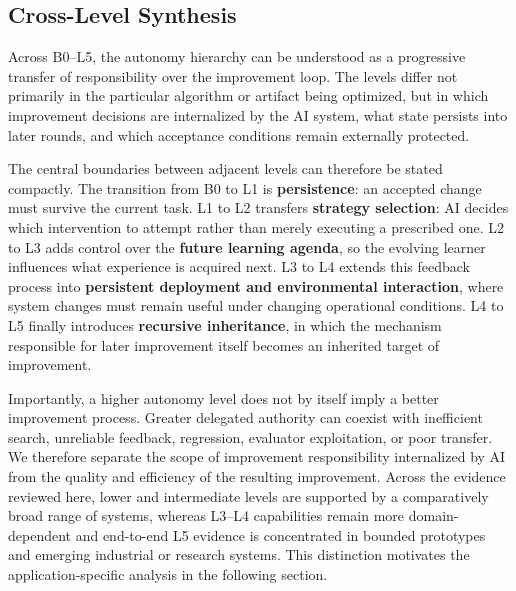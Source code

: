 \subsection{Cross-Level Synthesis}

Across B0--L5, the autonomy hierarchy can be understood as a progressive transfer of responsibility over the improvement loop. The levels differ not primarily in the particular algorithm or artifact being optimized, but in which improvement decisions are internalized by the AI system, what state persists into later rounds, and which acceptance conditions remain externally protected.


The central boundaries between adjacent levels can therefore be stated compactly. The transition from B0 to L1 is \textbf{persistence}: an accepted change must survive the current task. L1 to L2 transfers \textbf{strategy selection}: AI decides which intervention to attempt rather than merely executing a prescribed one. L2 to L3 adds control over the \textbf{future learning agenda}, so the evolving learner influences what experience is acquired next. L3 to L4 extends this feedback process into \textbf{persistent deployment and environmental interaction}, where system changes must remain useful under changing operational conditions. L4 to L5 finally introduces \textbf{recursive inheritance}, in which the mechanism responsible for later improvement itself becomes an inherited target of improvement.

Importantly, a higher autonomy level does not by itself imply a better improvement process. Greater delegated authority can coexist with inefficient search, unreliable feedback, regression, evaluator exploitation, or poor transfer. We therefore separate the scope of improvement responsibility internalized by AI from the quality and efficiency of the resulting improvement. Across the evidence reviewed here, lower and intermediate levels are supported by a comparatively broad range of systems, whereas L3--L4 capabilities remain more domain-dependent and end-to-end L5 evidence is concentrated in bounded prototypes and emerging industrial or research systems. This distinction motivates the application-specific analysis in the following section.